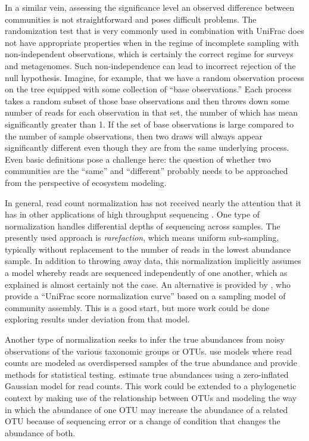 \documentclass{amsart}
\begin{document}
In a similar vein, assessing the significance level an observed difference between communities is not straightforward and poses difficult problems.
The randomization test that is very commonly used in combination with UniFrac does not have appropriate properties when in the regime of incomplete sampling with non-independent observations, which is certainly the correct regime for surveys and metagenomes.
Such non-independence can lead to incorrect rejection of the null hypothesis.
Imagine, for example, that we have a random observation process on the tree equipped with some collection of ``base observations.''
Each process takes a random subset of those base observations and then throws down some number of reads for each observation in that set, the number of which has mean significantly greater than 1.
If the set of base observations is large compared to the number of sample observations, then two draws will always appear significantly different even though they are from the same underlying process.
Even basic definitions pose a challenge here: the question of whether two communities are the ``same'' and ``different'' probably needs to be approached from the perspective of ecosystem modeling.

In general, read count normalization has not received nearly the attention that it has in other applications of high throughput sequencing \citep[such as RNA-Seq, e.g.][]{anders2010differential,robinson2010edger}.
One type of normalization handles differential depths of sequencing across samples.
The presently used approach is \textit{rarefaction}, which means uniform sub-sampling, typically without replacement \citep{caporaso2010qiime,schloss2009introducing} to the number of reads in the lowest abundance sample.
In addition to throwing away data, this normalization implicitly assumes a model whereby reads are sequenced independently of one another, which as explained is almost certainly not the case.
An alternative is provided by \citet{o2012phylogenetic}, who provide a ``UniFrac score normalization curve'' based on a sampling model of community assembly.
This is a good start, but more work could be done exploring results under deviation from that model.

Another type of normalization seeks to infer the true abundances from noisy observations of the various taxonomic groups or OTUs.
\citet{holmes2012dirichlet,la2012hypothesis} use models where read counts are modeled as overdispersed samples of the true abundance and provide methods for statistical testing.
\citet{paulson2013differential} estimate true abundances using a zero-inflated Gaussian model for read counts.
This work could be extended to a phylogenetic context by making use of the relationship between OTUs and modeling the way in which the abundance of one OTU may increase the abundance of a related OTU because of sequencing error or a change of condition that changes the abundance of both.
\end{document}
